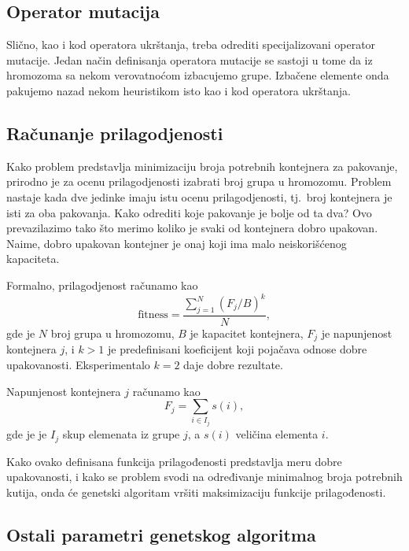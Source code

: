 \documentclass[a4paper,12pt,twocolumn]{article}
\begin{document}
\subsection{Operator mutacija}

Slično, kao i kod operatora ukrštanja, treba odrediti specijalizovani operator
mutacije. Jedan način definisanja operatora mutacije se sastoji u tome da
iz hromozoma sa nekom verovatnoćom izbacujemo grupe. Izbačene elemente onda 
pakujemo nazad nekom heuristikom isto kao i kod operatora ukrštanja.

\subsection{Računanje prilagodjenosti}

Kako problem predstavlja minimizaciju broja potrebnih kontejnera za pakovanje,
prirodno je za ocenu prilagodjenosti izabrati broj grupa u hromozomu.
Problem nastaje kada dve jedinke imaju istu ocenu prilagodjenosti, tj.\ 
broj kontejnera je isti za oba pakovanja. Kako odrediti koje pakovanje je
bolje od ta dva? Ovo prevazilazimo tako što merimo koliko je svaki od 
kontejnera dobro upakovan. Naime, dobro upakovan kontejner je onaj koji
ima malo neiskorišćenog kapaciteta.

Formalno, prilagodjenost računamo kao
\begin{equation}
    \text{fitness} = \frac{\sum_{j = 1}^N {(F_j/B)}^k}{N},
\end{equation}
gde je $N$ broj grupa u hromozomu, $B$ je kapacitet kontejnera, $F_j$
je napunjenost kontejnera $j$, i $k > 1$ je predefinisani koeficijent koji
pojačava odnose dobre upakovanosti. Eksperimentalo $k=2$ daje dobre 
rezultate\cite{f96}. 

Napunjenost kontejnera $j$ računamo kao 
\begin{equation}
    F_j = \sum_{i \in I_j} s(i),
\end{equation}
gde je je $I_j$ skup elemenata iz grupe $j$, a $s(i)$ veličina elementa $i$.

Kako ovako definisana funkcija prilagođenosti predstavlja meru dobre
upakovanosti, i kako se problem svodi na određivanje minimalnog broja potrebnih 
kutija, onda će genetski algoritam vršiti maksimizaciju funkcije 
prilagođenosti.

\subsection{Ostali parametri genetskog algoritma}
\end{document}

